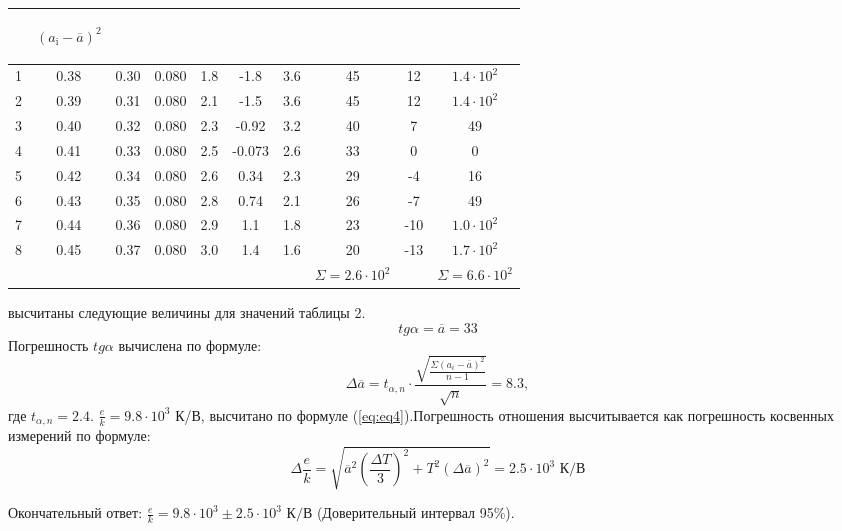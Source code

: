 \begin{center}
\begin{table}[H]
\begin{tabular}{|c|c|c|c|c|c|c|c|c|c|}
\begin{minipage}{21mm}
\end{minipage}&
\begin{minipage}{21mm}
     \begin{center} $(a_{\text{i}}-\overline{a})^2$ \end{center}
\end{minipage}\\
\hline
1 &  0.38  &  0.30  & 0.080 & 1.8& -1.8&3.6 & 45 &12 & $1.4\cdot 10^2$\\
2 &  0.39  &  0.31  &  0.080 & 2.1& -1.5&3.6 &45 &12 &$1.4\cdot 10^2$\\
3 &  0.40  &  0.32  & 0.080  & 2.3& -0.92&3.2 &40 &7 &49\\
4 & 0.41  &  0.33 &  0.080 & 2.5& -0.073&2.6  &33 &0 & 0\\
5 & 0.42  &  0.34  &  0.080 &  2.6&0.34 &2.3 &29 &-4 & 16 \\
6 & 0.43  &  0.35  &  0.080 & 2.8&0.74 &2.1 &26 &-7 & 49\\
7 & 0.44  &  0.36  &  0.080 & 2.9&1.1 &1.8 &23 &-10 & $1.0\cdot 10^2$ \\
8 & 0.45  &  0.37  &  0.080 & 3.0& 1.4 &1.6 &20 &-13 & $1.7\cdot 10^2$ \\
 &   &    &   & &  & & $\Sigma=2.6\cdot10^2$& & $\Sigma=6.6\cdot 10^2$ \\
\hline
\end{tabular}
\end{table}
\end{center}
 высчитаны следующие величины для значений таблицы 2.
\begin{equation}
    tg{\alpha}=\overline{a}=33
\end{equation}
Погрешность $tg{\alpha}$ вычислена по формуле:
\begin{equation}
    \Delta\overline{a}=t_{\alpha,n}\cdot\frac{\sqrt{\frac{\Sigma(a_i-\overline{a})^2}{{n-1}}}}{\sqrt{n}}=8.3,
\end{equation}
где $t_{\alpha,n}=2.4$.
 $\frac{e}{k}=9.8\cdot10^3$ К/В, высчитано по формуле (\ref{eq:eq4}).Погрешность отношения высчитывается как погрешность косвенных измерений по формуле:
\begin{equation}
    \Delta\frac{e}{k}=\sqrt{\overline{a}^2(\frac{\Delta T}{3})^2+T^2(\Delta\overline{a})^2}=2.5\cdot10^3\text{ К/В}
\end{equation}
\par Окончательный ответ: $\frac{e}{k}=9.8\cdot10^3\pm2.5\cdot10^3\text{ К/В}$ (Доверительный интервал 95\%).
